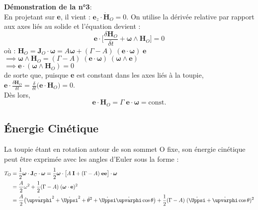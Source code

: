 \documentclass[a4paper]{article}
\begin{document}
\textbf{Démonstration de la n°3}: \\
En projetant sur \textbf{e}, il vient : $ \textbf{e}_z \cdot \dot{\textbf{H}}_O = 0 $. On utilise la dérivée relative par rapport aux axes liés au solide et l'équation devient :
\[ \textbf{e} \cdot \bigg[ \frac{\delta \textbf{H}_O}{\delta t} + \boldsymbol{\omega} \wedge \textbf{H}_O \bigg] = 0 \]
où : $\displaystyle \textbf{H}_O = \textbf{J}_O \cdot \boldsymbol{\omega} = A \boldsymbol{\omega} + (\Gamma - A) \; (\textbf{e} \cdot \boldsymbol{\omega}) \; \textbf{e} $ \\
$\displaystyle \implies \boldsymbol{\omega} \wedge \textbf{H}_O = (\Gamma - A) \; (\textbf{e} \cdot \boldsymbol{\omega}) \; (\boldsymbol{\omega} \wedge \textbf{e}) $ \\
$\displaystyle \implies \textbf{e} \cdot (\boldsymbol{\omega} \wedge \textbf{H}_O) = 0 $ \\
de sorte que, puisque \textbf{e} est constant dans les axes liés à la toupie, $\displaystyle \textbf{e} \cdot \frac{\delta \textbf{H}_O}{\delta t} = \frac{\delta}{\delta t} \big( \textbf{e} \cdot \textbf{H}_O \big) = 0 $. \\
Dès lors,
\[ \textbf{e} \cdot \textbf{H}_O = \Gamma \; \textbf{e} \cdot \boldsymbol{\omega} = \text{const.} \]





\subsection{Énergie Cinétique}





La toupie étant en rotation autour de son sommet O fixe, son énergie cinétique peut être exprimée avec les angles d'Euler sous la forme :
\[ \begin{aligned}
T_O &= \frac{1}{2} \boldsymbol{\omega} \cdot \textbf{J}_C \cdot \boldsymbol{\omega} = \frac{1}{2} \boldsymbol{\omega} \cdot \big[ A \; \textbf{I} + (\Gamma - A) \; \textbf{e} \textbf{e} \big] \cdot \boldsymbol{\omega} \\
&= \frac{A}{2} \omega^2 + \frac{1}{2} (\Gamma - A) \; (\boldsymbol{\omega} \cdot \textbf{e})^2 \\
&= \frac{A}{2} \big( \dot{\upvarphi}^2 + \dot{\Uppsi}^2 + \dot{\theta}^2 + \dot{\Uppsi} \dot{\upvarphi} \cos \theta \big) + \frac{1}{2} (\Gamma - A) \; (\dot{\Uppsi} + \dot{\upvarphi} \cos \theta)^2
\end{aligned} \]
\end{document}
